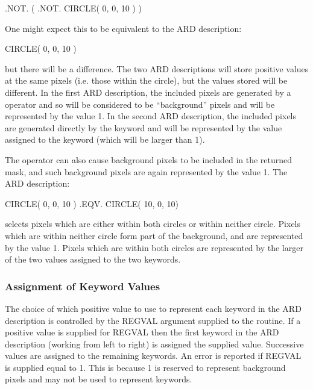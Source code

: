 \documentclass[11pt,nolof]{starlink}
\begin{document}
\small
\begin{terminalv}
      .NOT. ( .NOT. CIRCLE( 0, 0, 10 ) )
\end{terminalv}
\normalsize

One might expect this to be equivalent to the ARD description:

\small
\begin{terminalv}
      CIRCLE( 0, 0, 10 )
\end{terminalv}
\normalsize

but there will be a difference. The two ARD descriptions will store positive
values at the same pixels (i.e. those within the circle), but the values stored
will be different. In the first ARD description, the included pixels are
generated by a  operator and so will be considered to be ``background''
pixels and will be represented by the value 1. In the second ARD description,
the included pixels are generated directly by the  keyword and will be
represented by the value assigned to the keyword (which will be larger than 1).

The  operator can also cause background pixels to be included in the
returned mask, and such background pixels are again represented by the value 1.
The ARD description:

\small
\begin{terminalv}
      CIRCLE( 0, 0, 10 ) .EQV. CIRCLE( 10, 0, 10)
\end{terminalv}
\normalsize

selects pixels which are either within both circles or within neither circle.
Pixels which are within neither circle form part of the background, and are
represented by the value 1. Pixels which are within both circles are represented
by the larger of the two values assigned to the two keywords.

\subsubsection{Assignment of Keyword Values}
The choice of which positive value to use to represent each keyword in the ARD
description is controlled by the REGVAL argument supplied to the 
routine. If a positive value is supplied for REGVAL then the first keyword in the
ARD description (working from left to right) is assigned the supplied value.
Successive values are assigned to the remaining keywords. An error is reported
if REGVAL is supplied equal to 1. This is because 1 is reserved to represent
background pixels and may not be used to represent keywords.
\end{document}
